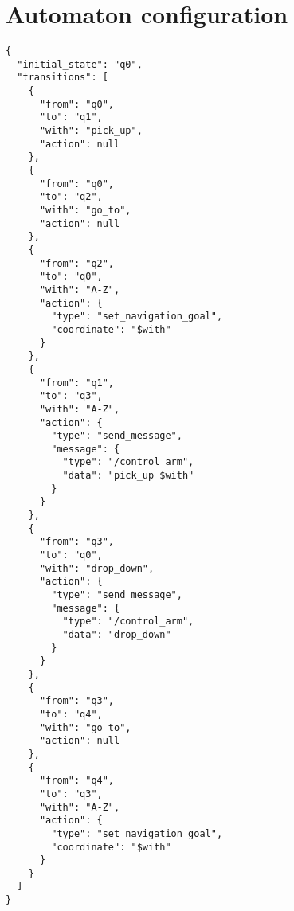 \documentclass[../thesis.tex]{subfiles}
\begin{document}
\section{Automaton configuration}\label{appendix:automaton_configuration_file}
\begin{lstlisting}[caption=JSON configuration file for the automaton]
{
  "initial_state": "q0",
  "transitions": [
    {
      "from": "q0",
      "to": "q1",
      "with": "pick_up",
      "action": null
    },
    {
      "from": "q0",
      "to": "q2",
      "with": "go_to",
      "action": null
    },
    {
      "from": "q2",
      "to": "q0",
      "with": "A-Z",
      "action": {
        "type": "set_navigation_goal",
        "coordinate": "$with"
      }
    },
    {
      "from": "q1",
      "to": "q3",
      "with": "A-Z",
      "action": {
        "type": "send_message",
        "message": {
          "type": "/control_arm",
          "data": "pick_up $with"
        }
      }
    },
    {
      "from": "q3",
      "to": "q0",
      "with": "drop_down",
      "action": {
        "type": "send_message",
        "message": {
          "type": "/control_arm",
          "data": "drop_down"
        }
      }
    },
    {
      "from": "q3",
      "to": "q4",
      "with": "go_to",
      "action": null
    },
    {
      "from": "q4",
      "to": "q3",
      "with": "A-Z",
      "action": {
        "type": "set_navigation_goal",
        "coordinate": "$with"
      }
    }
  ]
}
\end{lstlisting}
\end{document}
